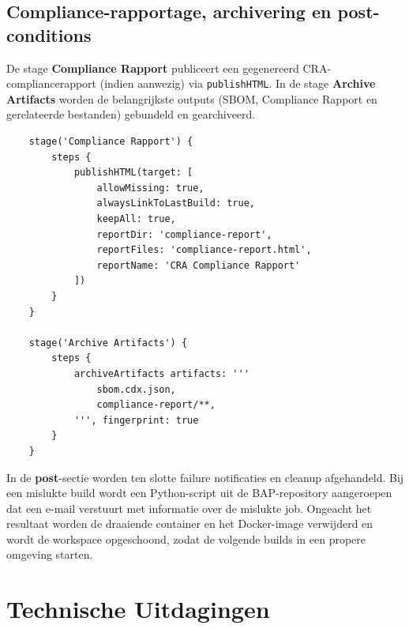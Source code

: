 \subsection{Compliance-rapportage, archivering en post-conditions}
De stage \textbf{Compliance Rapport} publiceert een gegenereerd CRA-compliancerapport (indien aanwezig) via \texttt{publishHTML}. In de stage \textbf{Archive Artifacts} worden de belangrijkste outputs (SBOM, Compliance Rapport en gerelateerde bestanden) gebundeld en gearchiveerd.
\begin{listing}[h]
    \caption{Compliance-rapport en archiveren van artefacten}
    \label{lst:jenkins-compliance-archive}
    \begin{verbatim}
    stage('Compliance Rapport') {
        steps {
            publishHTML(target: [
                allowMissing: true,
                alwaysLinkToLastBuild: true,
                keepAll: true,
                reportDir: 'compliance-report',
                reportFiles: 'compliance-report.html',
                reportName: 'CRA Compliance Rapport'
            ])
        }
    }
    
    stage('Archive Artifacts') {
        steps {
            archiveArtifacts artifacts: '''
                sbom.cdx.json,
                compliance-report/**,
            ''', fingerprint: true
        }
    }
    \end{verbatim}
\end{listing}
\FloatBarrier

In de \textbf{post}-sectie worden ten slotte failure notificaties en cleanup afgehandeld. Bij een mislukte build wordt een Python-script uit de BAP-repository aangeroepen dat een e-mail verstuurt met informatie over de mislukte job. Ongeacht het resultaat worden de draaiende container en het Docker-image verwijderd en wordt de workspace opgeschoond, zodat de volgende builds in een propere omgeving starten.

\section{Technische Uitdagingen}

